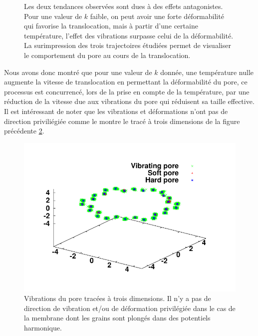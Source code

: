 \begin{figure}[H]
\begin{minipage}{0.63\linewidth}
\end{minipage}
\begin{minipage}{0.37\linewidth} 
\caption[Antagonisme des effets observés]{Les deux tendances observées sont dues à des effets antagonistes. Pour une valeur de $k$ faible, on peut avoir une forte déformabilité qui favorise la translocation, mais à partir d'une certaine température, l'effet des vibrations surpasse celui de la déformabilité. La surimpression des trois trajectoires étudiées permet de visualiser le comportement du pore au cours de la translocation.}
\label{antagonismesinfluence}
\end{minipage}
\end{figure}

Nous avons donc montré que pour une valeur de $k$ donnée, une température nulle augmente la vitesse de translocation en permettant la déformabilité du pore, ce processus est concurrencé, lors de la prise en compte de la température, par une réduction de la vitesse due aux vibrations du pore qui réduisent sa taille effective. Il est intéressant de noter que les vibrations et déformations n'ont pas de direction priviliégiée comme le montre le tracé à trois dimensions de la figure précédente \ref{3dplotpore}.


\begin{figure}[H]
\begin{center}


\includegraphics[width=1\textwidth]{porearea3d.pdf} 

\caption[Déplacement du pore à trois dimensions]{Vibrations du pore tracées à trois dimensions. Il n'y a pas de direction de vibration et/ou de déformation privilégiée dans le cas de la membrane dont les grains sont plongés dans des potentiels harmonique.}
\label{3dplotpore}
\end{center}
\end{figure}


